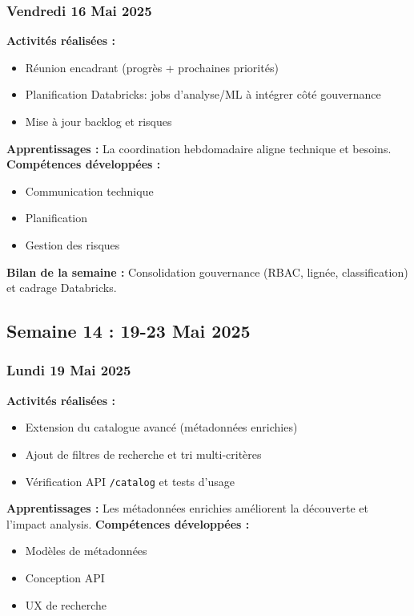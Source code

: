 \documentclass[12pt,a4paper]{article}
\begin{document}
\subsubsection{Vendredi 16 Mai 2025}
\textbf{Activités réalisées :}
\begin{itemize}
    \item Réunion encadrant (progrès + prochaines priorités)
    \item Planification Databricks: jobs d'analyse/ML à intégrer côté gouvernance
    \item Mise à jour backlog et risques
\end{itemize}
\textbf{Apprentissages :} La coordination hebdomadaire aligne technique et besoins.
\textbf{Compétences développées :}
\begin{itemize}
    \item Communication technique
    \item Planification
    \item Gestion des risques
\end{itemize}
\textbf{Bilan de la semaine :} Consolidation gouvernance (RBAC, lignée, classification) et cadrage Databricks.

\clearpage
\subsection{Semaine 14 : 19-23 Mai 2025}

\subsubsection{Lundi 19 Mai 2025}
\textbf{Activités réalisées :}
\begin{itemize}
    \item Extension du catalogue avancé (métadonnées enrichies)
    \item Ajout de filtres de recherche et tri multi-critères
    \item Vérification API \texttt{/catalog} et tests d'usage
\end{itemize}
\textbf{Apprentissages :} Les métadonnées enrichies améliorent la découverte et l'impact analysis.
\textbf{Compétences développées :}
\begin{itemize}
    \item Modèles de métadonnées
    \item Conception API
    \item UX de recherche
\end{itemize}
\end{document}
